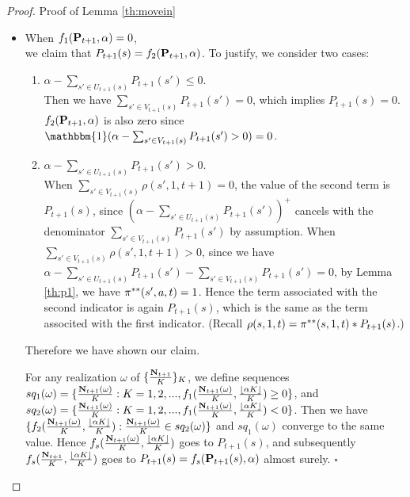 \begin{proof}{Proof of Lemma \ref{th:movein}}
\begin{itemize}
The rest of the argument to prove that $f_s(\frac{\Nv_{t+1}}{K},\frac{\lfloor\alpha K\rfloor}{K})$ goes to $ f_s(\Pv_{t+1}(s),\alpha)$ almost surely follows the same as the first case.
\item When $f_1(\mathbf{P}_{t+1},\alpha)=0$,\\
we claim that $P_{t+1}(s) = f_2(\mathbf{P}_{t+1},\alpha)$. To justify, we consider two cases:
\begin{enumerate}
\item $\alpha-\sum_{s'\in U_{t+1}(s)}P_{t+1}(s')\leq 0$.\\ Then we have $\sum_{s'\in V_{t+1}(s)}P_{t+1}(s') = 0$, which implies $P_{t+1}(s)=0$. 
$f_2(\mathbf{P}_{t+1},\alpha)$ is also zero since $\mathbbm{1}(\alpha -\sum_{s'\in V_{t+1}(s)}P_{t+1}(s')>0)=0$.
\item $\alpha-\sum_{s'\in U_{t+1}(s)}P_{t+1}(s')>0$.\\ When $\sum_{s'\in V_{t+1}(s)}\rho(s',1,t+1)=0$, the value of the second term is $P_{t+1}(s)$, since $(\alpha -\sum_{s'\in U_{t+1}(s)}P_{t+1}(s'))^+$ cancels with the denominator $\sum_{s'\in V_{t+1}(s)}P_{t+1}(s')$ by assumption. When $\sum_{s'\in V_{t+1}(s)}\rho(s',1,t+1)>0$, since we have $\alpha-\sum_{s'\in U_{t+1}(s)}P_{t+1}(s') - \sum_{s'\in V_{t+1}(s)}P_{t+1}(s') = 0$, by Lemma \ref{th:p1}, we have $\pi^{**}(s',a,t)=1$. Hence the term associated with the second indicator is again $P_{t+1}(s)$, which is the same as the term associted with the first indicator. (Recall $\rho(s,1,t)=\pi^{**}(s,1,t)*P_{t+1}(s)$.) 
 \end{enumerate}
 Therefore we have shown our claim.
 
 For any realization $\omega$ of $\{\frac{\mathbf{N}_{t+1}}{K}\}_K$, we define sequences $sq_1(\omega) = \{\frac{\mathbf{N}_{t+1}(\omega)}{K}:K=1,2,..., f_1(\frac{\mathbf{N}_{t+1}(\omega)}{K},\frac{\lfloor\alpha K\rfloor}{K})\geq 0\}$, and $sq_2(\omega) = \{\frac{\mathbf{N}_{t+1}(\omega)}{K}:K=1,2,..., f_1(\frac{\mathbf{N}_{t+1}(\omega)}{K},\frac{\lfloor\alpha K\rfloor}{K})< 0\}$.
  Then we have $\{f_2(\frac{\mathbf{N}_{t+1}(\omega)}{K},\frac{\lfloor\alpha K\rfloor}{K}):	\frac{\mathbf{N}_{t+1}(\omega)}{K}\in sq_2(\omega)\}$ and $sq_1(\omega)$ converge to the same value. Hence $f_s(\frac{\mathbf{N}_{t+1}(\omega)}{K},\frac{\lfloor\alpha K\rfloor}{K})$ goes to $P_{t+1}(s)$, and subsequently $f_s(\frac{\Nv_{t+1}}{K},\frac{\lfloor\alpha K\rfloor}{K})$ goes to $P_{t+1}(s) = f_s(\mathbf{P}_{t+1}(s),\alpha)$ almost surely.   $\square$
\end{itemize}
\end{proof}


